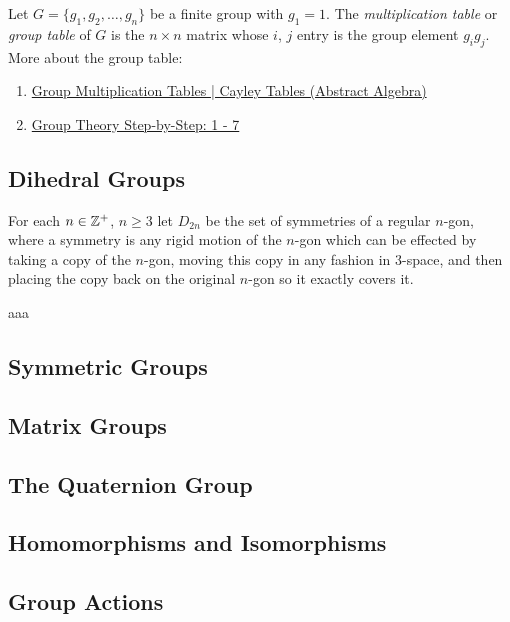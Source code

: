 {Let $G=\{g_{1},g_{2},\dots,g_{n}\}$ be a finite group with $g_{1} = 1$.
The {\sl multiplication table} or {\sl group table} of $G$ is the $n\times n$ matrix
whose $i$, $j$ entry is the group element $g_{i}g_{j}$.
}
More about the group table:
\begin{enumerate}[leftmargin=20pt, itemsep=0pt, topsep=0pt]
    \item \href{https://youtu.be/BwHspSCXFNM?si=1ucTvpLN6bGUYX9v}{Group Multiplication Tables | Cayley Tables (Abstract Algebra)}
    \item \href{https://youtu.be/tGCqP2ytP14?si=3P4tafGvrpjJWQyd}{Group Theory Step-by-Step: 1 - 7}
\end{enumerate}

\newpage
\thispagestyle{evenpagestyle}
\subsection{Dihedral Groups}
For each $n\in \mathbb{Z}^{+}$, $n\ge 3$ let $D_{2n}$ be the set of symmetries
of a regular $n$-gon, where a symmetry is any rigid motion of the $n$-gon which can
be effected by taking a copy of the $n$-gon, moving this copy in any fashion in $3$-space,
and then placing the copy back on the original $n$-gon so it exactly covers it.



aaa


\subsection{Symmetric Groups}









\subsection{Matrix Groups}









\subsection{The Quaternion Group}









\subsection{Homomorphisms and Isomorphisms}









\subsection{Group Actions}








